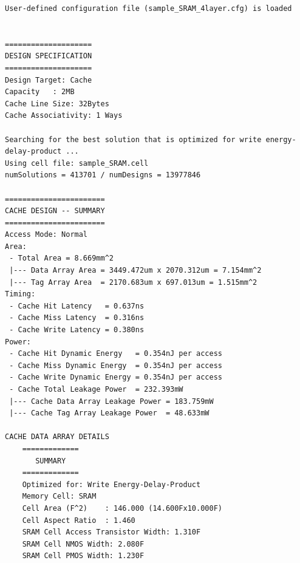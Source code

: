 \documentclass[11pt]{article}
\begin{document}
\begin{verbatim}
User-defined configuration file (sample_SRAM_4layer.cfg) is loaded


====================
DESIGN SPECIFICATION
====================
Design Target: Cache
Capacity   : 2MB
Cache Line Size: 32Bytes
Cache Associativity: 1 Ways

Searching for the best solution that is optimized for write energy-delay-product ...
Using cell file: sample_SRAM.cell
numSolutions = 413701 / numDesigns = 13977846

=======================
CACHE DESIGN -- SUMMARY
=======================
Access Mode: Normal
Area:
 - Total Area = 8.669mm^2
 |--- Data Array Area = 3449.472um x 2070.312um = 7.154mm^2
 |--- Tag Array Area  = 2170.683um x 697.013um = 1.515mm^2
Timing:
 - Cache Hit Latency   = 0.637ns
 - Cache Miss Latency  = 0.316ns
 - Cache Write Latency = 0.380ns
Power:
 - Cache Hit Dynamic Energy   = 0.354nJ per access
 - Cache Miss Dynamic Energy  = 0.354nJ per access
 - Cache Write Dynamic Energy = 0.354nJ per access
 - Cache Total Leakage Power  = 232.393mW
 |--- Cache Data Array Leakage Power = 183.759mW
 |--- Cache Tag Array Leakage Power  = 48.633mW

CACHE DATA ARRAY DETAILS    
    =============
       SUMMARY   
    =============
    Optimized for: Write Energy-Delay-Product
    Memory Cell: SRAM
    Cell Area (F^2)    : 146.000 (14.600Fx10.000F)
    Cell Aspect Ratio  : 1.460
    SRAM Cell Access Transistor Width: 1.310F
    SRAM Cell NMOS Width: 2.080F
    SRAM Cell PMOS Width: 1.230F
    

\end{verbatim}
\end{document}

